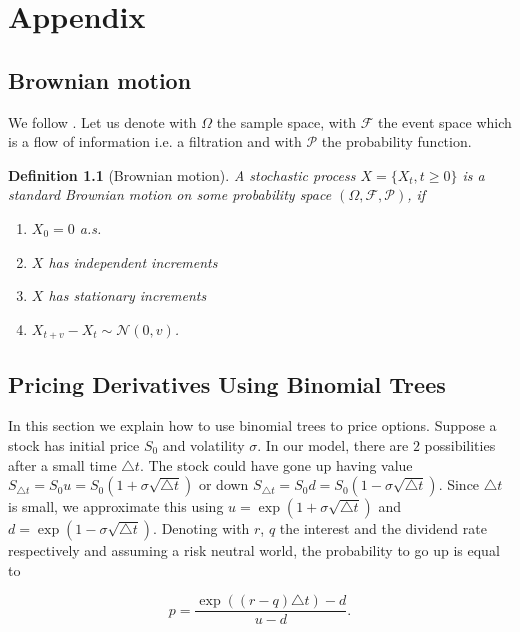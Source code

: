 \documentclass[12pt,a4paper,oneside]{book}
\newtheorem{Definition}{Definition}
\begin{document}
\chapter{Appendix} 

\section{Brownian motion}\label{Brownian_Motion}

We follow \cite{wimschoutensvg}. Let us denote with $\Omega$ the sample space, with $\mathcal{F}$ the event space which is a flow of information i.e. a filtration and with $\mathcal{P}$ the probability function.

\begin{Definition}[Brownian motion]
A stochastic process $X = \{ X_t, t \geq 0 \}$ is a standard Brownian motion on some probability space $(\Omega,\mathcal{F}, \mathcal{P})$, if

\begin{enumerate}
    \item $X_0 = 0$ a.s.
    \item $X$ has independent increments
    \item $X$ has stationary increments
    \item $X_{t+v} - X_t \sim \mathcal{N}(0,v)$.
\end{enumerate}
\end{Definition}


\section{Pricing Derivatives Using Binomial Trees}\label{appendix_tree}

In this section we explain how to use binomial trees to price options. Suppose a stock has initial price $S_0$ and volatility $\sigma$. In our model, there are $2$ possibilities after a small time $\triangle t$. The stock could have gone up having value $S_{\triangle t} = S_0 u= S_0(1+ \sigma \sqrt {\triangle t})$ or down $S_{\triangle t} = S_0 d= S_0(1- \sigma \sqrt{\triangle t})$. Since $\triangle t$ is small, we approximate this using $u = \exp{( 1+ \sigma \sqrt {\triangle t})}$ and $d = \exp{(1- \sigma \sqrt{\triangle t})}$. Denoting with $r$, $q$ the interest and  the dividend rate respectively and assuming a risk neutral world, the probability to go up is equal to

\begin{equation}
p = \dfrac{\exp{((r-q) \triangle t) -d }}{u-d}.
\end{equation}
\end{document}
